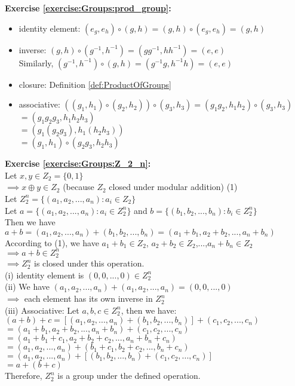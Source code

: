 \noindent\textbf{Exercise \ref{exercise:Groups:prod_group}:}
\begin{itemize}
\item
identity element: $(e_g, e_h) \circ (g, h) = (g, h) \circ (e_g, e_h) = (g, h)$

\item
inverse: $(g, h) \circ (g^{-1}, h^{-1}) = (g g^{-1}, h h^{-1}) = (e, e)$\\
Similarly, $(g^{-1}, h^{-1}) \circ (g, h)  = ( g^{-1} g,  h^{-1}h) = (e, e)$

\item
closure: Definition \ref{def:ProductOfGroups}

\item
associative: $((g_1, h_1) \circ (g_2, h_2)) \circ (g_3, h_3) = (g_1 g_2, h_1 h_2) \circ (g_3, h_3)$\\
$= (g_1 g_2 g_3, h_1 h_2 h_3)$\\
$= (g_1 (g_2 g_3), h_1 (h_2 h_3))$\\
$= (g_1, h_1) \circ (g_2 g_3, h_2 h_3)$
\end{itemize}

\textbf{Exercise \ref{exercise:Groups:Z_2_n}:}\\
Let $x,y\in Z_2=\{0,1\}$\\
$\implies x\oplus y\in Z_2$ (because $Z_2$ closed under modular addition) (1)\\
Let $Z_2^n=\{(a_1,a_2,...,a_n):a_i\in Z_2\}$\\
Let $a=\{(a_1,a_2,...,a_n):a_i\in Z_2^n\}$ and $b=\{(b_1,b_2,...,b_n):b_i\in Z_2^n\}$\\
Then we have $a+b=(a_1,a_2,...,a_n)+(b_1,b_2,...,b_n)=(a_1+b_1,a_2+b_2,...,a_n+b_n)$\\
According to (1), we have $a_1+b_1\in Z_2$, $a_2+b_2\in Z_2$,...,$a_n+b_n\in Z_2$\\
$\implies a+b\in Z_2^n$\\
$\implies Z_2^n$ is closed under this operation.\\
(i) identity element is $(0,0,...,0)\in Z_2^n$\\
(ii) We have $(a_1,a_2,...,a_n)+(a_1,a_2,...,a_n)=(0,0,...,0)$\\
$\implies$  each element has its own inverse in $Z_2^n$\\
(iii) Associative: Let $a,b,c\in Z_2^n$, then we have:\\
$(a+b)+c =[(a_1,a_2,...,a_n)+(b_1,b_2,...,b_n)]+(c_1,c_2,...,c_n)$\\
$=(a_1+b_1,a_2+b_2,...,a_n+b_n)+(c_1,c_2,...,c_n)$\\
$=(a_1+b_1+c_1,a_2+b_2+c_2,...,a_n+b_n+c_n)$\\
$=(a_1,a_2,...,a_n)+(b_1+c_1,b_2+c_2,...,b_n+c_n)$\\
$=(a_1,a_2,...,a_n)+[(b_1,b_2,...,b_n)+(c_1,c_2,...,c_n)]$\\
$=a+(b+c)$\\
Therefore, $Z_2^n$ is a group under the defined operation.\\
\\


